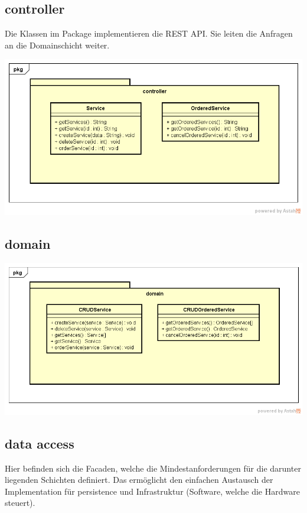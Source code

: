 \documentclass[11pt]{scrartcl}
\begin{document}
\subsection{controller}
Die Klassen im Package implementieren die REST API. Sie leiten die Anfragen an die Domainschicht weiter.

\begin{center}
\includegraphics[scale=0.5]{Klassenstruktur-controller}
\end{center}

\subsection{domain}
\begin{center}
\includegraphics[scale=0.5]{Klassenstruktur-domain}
\end{center}

\newpage

\subsection{data access}
Hier befinden sich die Facaden, welche die Mindestanforderungen für die darunter liegenden Schichten definiert. Das ermöglicht den einfachen Austausch der Implementation für persistence und Infrastruktur (Software, welche die Hardware steuert).
\end{document}
